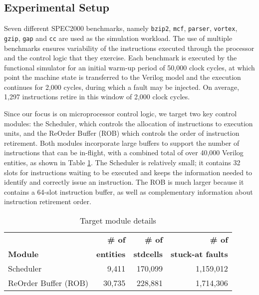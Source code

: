 \documentclass[12pt]{yalephd}
\begin{document}
\subsection{Experimental Setup}
\label{sC2Experimental_Setup}

 Seven different SPEC2000 benchmarks, namely \texttt{bzip2}, \texttt{mcf}, \texttt{parser},  \texttt{vortex}, \texttt{gzip}, \texttt{gap} and \texttt{cc} are used as the simulation workload. The use of multiple benchmarks ensures variability of the instructions executed through the processor and the control logic that they exercise. Each benchmark is executed by the functional simulator for an initial warm-up period of 50,000 clock cycles, at which point the machine state is transferred to the Verilog model and the execution continues for 2,000 cycles, during which a fault may be injected. On average, 1,297 instructions retire in this window of 2,000 clock cycles.

 Since our focus is on microprocessor control logic, we target two key control modules: the Scheduler, which controls the allocation of instructions to execution units, and the ReOrder Buffer (ROB) which controls the order of instruction retirement. Both modules incorporate large buffers to support the number of instructions that can be in-flight, with a combined total of over 40,000 Verilog entities, as shown in Table \ref{sC2RT_level_stats}. The Scheduler is relatively small; it contains 32 slots for instructions waiting to be executed and keeps the information needed to identify and correctly issue an instruction. The ROB is much larger because it contains a 64-slot instruction buffer, as well as complementary information about instruction retirement order.

\begin{table}[!ht]
\caption{Target module details}\label{sC2RT_level_stats}
\begin{center}
\begin{tabular}{||l|r|r|r||}
\hline
\hline
& {\bf \# of} & {\bf \# of} & {\bf \# of} \\
{\bf Module } & {\bf entities} & {\bf stdcells} & {\bf stuck-at faults} \\
\hline
Scheduler & 9,411 & 170,099 & 1,159,012 \\
\hline
ReOrder Buffer (ROB) & 30,735 & 228,881 & 1,714,306 \\
\hline
\hline
\end{tabular}
\end{center}
\end{table}
\end{document}
